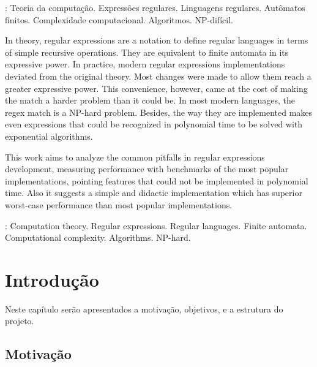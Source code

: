 \documentclass[a4paper,12pt,oneside,onecolumn]{uerj}
\begin{document}
: Teoria da computação. Expressões regulares. Linguagens regulares. Autômatos finitos. Complexidade computacional. Algoritmos. NP-difícil.



In theory, regular expressions are a notation to define regular languages in terms of simple recursive operations. They are equivalent to finite automata in its expressive power. In practice, modern regular expressions implementations deviated from the original theory. Most changes were made to allow them reach a greater expressive power. This convenience, however, came at the cost of making the match a harder problem than it could be. In most modern languages, the regex match is a NP-hard problem. Besides, the way they are implemented makes even expressions that could be recognized in polynomial time to be solved with exponential algorithms.

This work aims to analyze the common pitfalls in regular expressions development, measuring performance with benchmarks of the most popular implementations, pointing features that could not be implemented in polynomial time. Also it suggests a simple and didactic implementation which has superior worst-case performance than most popular implementations.

: Computation theory. Regular expressions. Regular languages. Finite automata. Computational complexity. Algorithms. NP-hard.

\listadefiguras
\lstlistoflistings

\sumario

\mainmatter

\chapter{Introdução}

Neste capítulo serão apresentados a motivação, objetivos, e a estrutura do projeto.

\section{Motivação}
\end{document}
